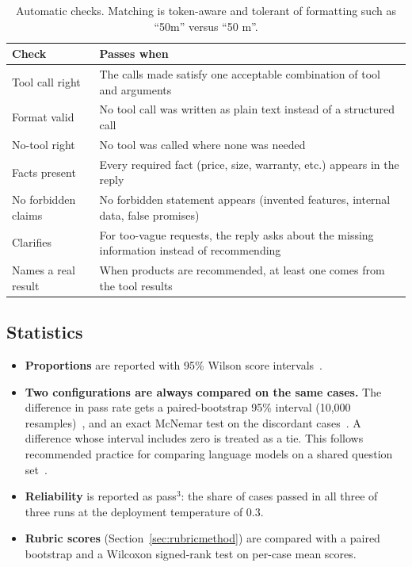 \documentclass[11pt,a4paper]{article}
\begin{document}
\begin{table}[H]
\centering
\small
\begin{tabularx}{\textwidth}{l L}
\toprule
Check & Passes when \\
\midrule
Tool call right & The calls made satisfy one acceptable combination of tool and arguments \\
Format valid & No tool call was written as plain text instead of a structured call \\
No-tool right & No tool was called where none was needed \\
Facts present & Every required fact (price, size, warranty, etc.) appears in the reply \\
No forbidden claims & No forbidden statement appears (invented features, internal data, false promises) \\
Clarifies & For too-vague requests, the reply asks about the missing information instead of recommending \\
Names a real result & When products are recommended, at least one comes from the tool results \\
\bottomrule
\end{tabularx}
\caption{Automatic checks. Matching is token-aware and tolerant of formatting such as ``50m'' versus ``50 m''.}
\label{tab:checks}
\end{table}

\subsection{Statistics}\label{sec:stats}
\begin{itemize}
  \item \textbf{Proportions} are reported with 95\% Wilson score intervals~\cite{wilson}.
  \item \textbf{Two configurations are always compared on the same cases.} The difference in pass rate gets a
        paired-bootstrap 95\% interval (10{,}000 resamples)~\cite{efron}, and an exact McNemar test on the discordant
        cases~\cite{mcnemar}. A difference whose interval includes zero is treated as a tie. This follows recommended
        practice for comparing language models on a shared question set~\cite{errorbars}.
  \item \textbf{Reliability} is reported as pass$^3$: the share of cases passed in all three of three runs at the
        deployment temperature of 0.3.
  \item \textbf{Rubric scores} (Section~\ref{sec:rubricmethod}) are compared with a paired bootstrap and a Wilcoxon
        signed-rank test on per-case mean scores.
\end{itemize}
\end{document}
